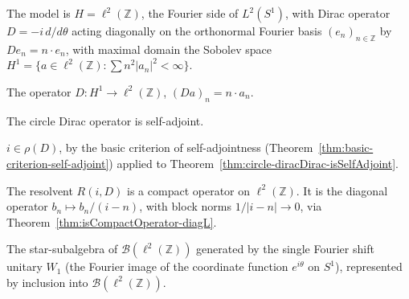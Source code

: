 The model is $H = \ell^2(\mathbb{Z})$, the Fourier side of $L^2(S^1)$, with Dirac operator
$D = -i\,d/d\theta$ acting diagonally on the orthonormal Fourier basis $(e_n)_{n \in
\mathbb{Z}}$ by $D e_n = n \cdot e_n$, with maximal domain the Sobolev space $H^1 = \{a \in
\ell^2(\mathbb{Z}) : \sum n^2 |a_n|^2 < \infty\}$.

\begin{definition}
  \label{def:circle-diracDirac}
  \leanok
  The operator $D \colon H^1 \to \ell^2(\mathbb{Z})$, $(D a)_n = n \cdot a_n$.
\end{definition}

\begin{theorem}
  \label{thm:circle-diracDirac-isSelfAdjoint}
  \leanok
  The circle Dirac operator is self-adjoint.
\end{theorem}

\begin{theorem}
  \label{thm:circle-mem-resolventSet-I}
  \leanok
  $i \in \rho(D)$, by the basic criterion of self-adjointness
  (Theorem~\ref{thm:basic-criterion-self-adjoint}) applied to
  Theorem~\ref{thm:circle-diracDirac-isSelfAdjoint}.
\end{theorem}

\begin{theorem}
  \label{thm:circle-isCompactOperator-resolvent-I}
  \leanok
  The resolvent $R(i, D)$ is a compact operator on $\ell^2(\mathbb{Z})$. It is the diagonal
  operator $b_n \mapsto b_n / (i - n)$, with block norms $1/|i-n| \to 0$, via
  Theorem~\ref{thm:isCompactOperator-diagL}.
\end{theorem}

\begin{definition}
  \label{def:circle-algebra}
  \leanok
  The star-subalgebra of $\mathcal{B}(\ell^2(\mathbb{Z}))$ generated by the single Fourier
  shift unitary $W_1$ (the Fourier image of the coordinate function $e^{i\theta}$ on $S^1$),
  represented by inclusion into $\mathcal{B}(\ell^2(\mathbb{Z}))$.
\end{definition}

